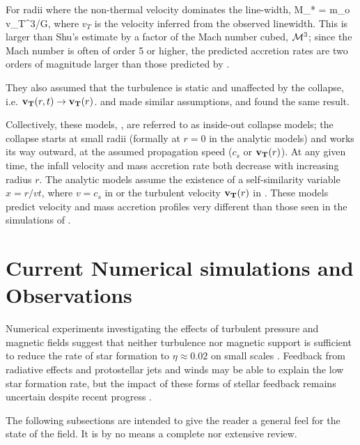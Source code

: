 \documentclass[../dissertation.tex]{subfiles}
\begin{document}
For radii where the non-thermal velocity dominates the line-width, 
%
\be
\dot M_* = m_o v_T^3/G,
\ee
%
where $v_T$ is the velocity inferred from the observed linewidth. 
This is larger than Shu's estimate by a factor of the Mach number cubed, ${\cal M}^3$; since the Mach number is often of order 5 or higher, the predicted accretion rates are two orders of magnitude larger than those predicted by \citet{1977ApJ...214..488S}.

They also assumed that the turbulence is static and unaffected by the collapse, i.e. $\mathbf{v_T} (r,t) \rightarrow \mathbf{v_T} (r)$.  
\citet{1997ApJ...476..750M} and \citet{2003ApJ...585..850M} made similar assumptions, and found the same result.  

Collectively, these models, \citep{1977ApJ...214..488S,1992ApJ...396..631M,1997ApJ...476..750M,2003ApJ...585..850M}, 
are referred to as inside-out collapse models; the collapse starts at small radii (formally at $r=0$ in the analytic models) 
and works its way outward, at the assumed propagation speed ($c_s$ or $\mathbf{v_T} (r)$). 
At any given time, the infall velocity and mass accretion rate both decrease with increasing radius $r$. 
The analytic models assume the existence of a self-similarity variable $x = r/vt$, where $v=c_s$ in 
\citet{1977ApJ...214..488S} or the turbulent velocity $\mathbf{v_T} (r)$ in \citet{1992ApJ...396..631M,1997ApJ...476..750M,2003ApJ...585..850M}.  
These models predict velocity and mass accretion profiles very different than those seen 
in the simulations of \citet{2015ApJ...800...49L}.


\section{Current Numerical simulations and Observations} \label{current_obs}
Numerical experiments investigating the effects of turbulent pressure and magnetic fields suggest that neither turbulence nor magnetic support is sufficient 
to reduce the rate of star formation to $\eta\approx 0.02$ on small scales
\citep{2010ApJ...709...27W,2011MNRAS.410L...8C,2011ApJ...730...40P,2012ApJ...754...71K,2014MNRAS.439.3420M}. 
Feedback from radiative effects and protostellar jets and winds may be able to explain the low star formation rate, 
but the impact of these forms of stellar feedback remains uncertain despite recent progress
\citep{2010ApJ...709...27W,2014MNRAS.439.3420M,2015MNRAS.450.4035F}.

The following subsections are intended to give the reader a general feel for the state of the field. 
It is by no means a complete nor extensive review.
\end{document}
